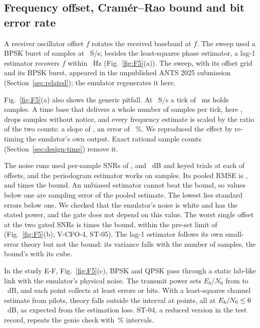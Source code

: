 \subsection{Frequency offset, Cram\'er--Rao bound and bit error rate}
A receiver oscillator offset $f$ rotates the received baseband at $f$. The sweep
used a BPSK burst of \numCfoBurstSamples{} samples at \numCfoRateSps~S/s; besides the
least-squares phase estimator, a lag-1 estimator recovers $f$ within \numCfoLagMaxErrHz~Hz
(Fig.~\ref{fig:F5}(a)). The sweep, with its offset grid and its BPSK
burst, appeared in the unpublished ANTS 2025 submission (Section~\ref{sec:related});
the emulator regenerates it here.

Fig.~\ref{fig:F5}(a) also shows the generic pitfall. At
\numCfoRateSps~S/s a tick of \numCfoTickMs~ms holds \numCfoSamplesPerTick{} samples. A time
base that delivers a whole number of samples per tick, here \numCfoSamplesDelivered{}, drops
samples without notice, and every frequency estimate is scaled by the ratio of the two counts:
a slope of \numCfoTickScale{}, an error of \numCfoTickScalePct~\%. We reproduced the effect by
re-timing the emulator's own output. Exact rational sample counts
(Section~\ref{sec:design-time}) remove it.

The noise runs used per-sample SNRs of \numCfoSnrLo{},
\numCfoSnrMid{} and \numCfoSnrHi~dB and \numCfoTrials{} keyed trials at each of
\numCfoPoints{} offsets, and the periodogram estimator works on \numCfoHeaderSamples{}
samples. Its pooled RMSE is
\numCfoRatioZero, \numCfoRatioTen{} and \numCfoRatioTwenty{} times the bound. An unbiased
estimator cannot beat the bound, so values below one are sampling error of the pooled
estimate. The lowest lies \numCfoRatioTwentySe{} standard errors below one. We checked that the
emulator's noise is white and has the stated power, and the gate does not depend on this
value. The worst single offset at the two gated SNRs is \numCfoRatioMaxPoint{} times the bound, within the
pre-set limit of \numCfoGateFactor{} (Fig.~\ref{fig:F5}(b); V-CFO-4, ST-05). The lag-1
estimator follows its own small-error theory but not the bound: its variance falls with the
number of samples, the bound's with its cube.

In the study E-F, Fig.~\ref{fig:F5}(c), BPSK and QPSK pass through a static
lab-like link with the emulator's physical noise. The transmit power sets $E_b/N_0$ from \numBerEbnoMin{} to \numBerEbnoMax~dB, and
each point collects at least \numBerMinErrors{} errors or \numBerMaxBits{} bits. With a
least-squares channel estimate from
\numBerPilots{} pilots, theory falls outside the interval at \numBerLsOutside{} points, all at
$E_b/N_0\le6$~dB, as expected from the estimation loss. ST-04, a
reduced version in the test record, repeats the genie check with \numBerStCiPct\,\% intervals.

